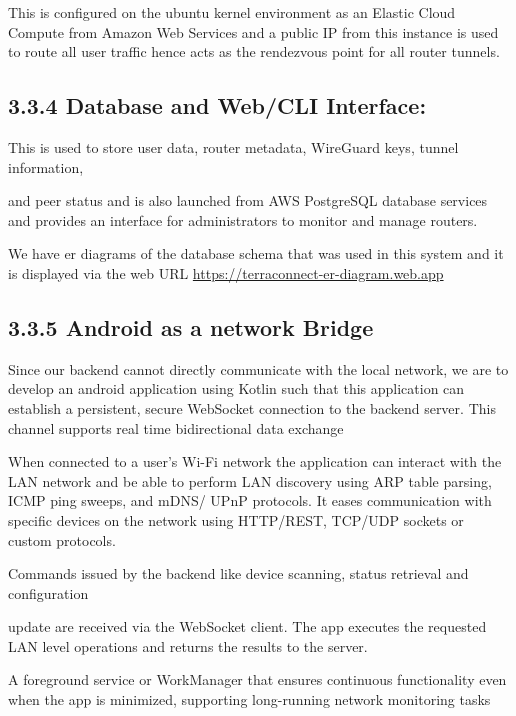\documentclass[12pt,a4paper,oneside]{report}
\begin{document}
This is configured on the ubuntu kernel environment as an Elastic Cloud Compute from Amazon Web Services and a public IP from this instance is used to route all user traffic hence acts as the rendezvous point for all router tunnels.


\subsection{3.3.4 Database and Web/CLI Interface:}

This is used to store user data, router metadata, WireGuard keys, tunnel information,


and peer status and is also launched from AWS PostgreSQL database services and provides an interface for administrators to monitor and manage routers.


We have er diagrams of the database schema that was used in this system and it is displayed via the web URL \href{https://terraconnect-er-diagram.web.app}{https://terraconnect-er-diagram.web.app}




\subsection{3.3.5 Android as a network Bridge}

Since our backend cannot directly communicate with the local network, we are to develop an android application using Kotlin such that this application can establish a persistent, secure WebSocket connection to the backend server. This channel supports real time bidirectional data exchange


When connected to a user's Wi-Fi network the application can interact with the LAN network and be able to perform LAN discovery using ARP table parsing, ICMP ping sweeps, and mDNS/ UPnP protocols. It eases communication with specific devices on the network using HTTP/REST, TCP/UDP sockets or custom protocols.


Commands issued by the backend like device scanning, status retrieval and configuration


update are received via the WebSocket client. The app executes the requested LAN level operations and returns the results to the server.


A foreground service or WorkManager that ensures continuous functionality even when the app is minimized, supporting long-running network monitoring tasks
\end{document}
